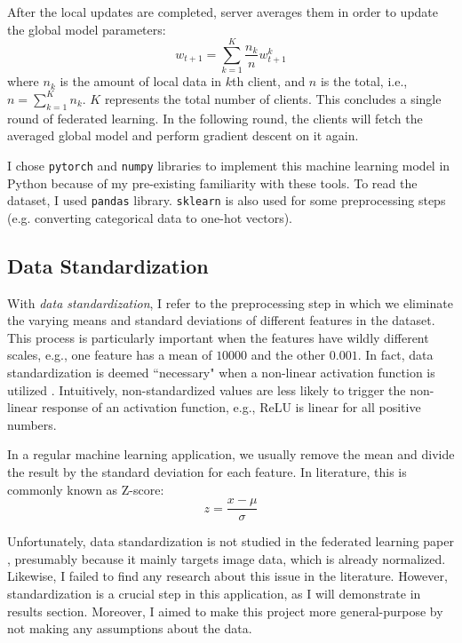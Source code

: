 After the local updates are completed, server averages them in order to update the global model parameters:
\begin{equation}
    w_{t+1} = \sum_{k=1}^K \frac{n_k}{n} w^k_{t+1}
\end{equation}
where $n_k$ is the amount of local data in $k$th client, and $n$ is the total, i.e., $n = \sum_{k=1}^K n_k$.
$K$ represents the total number of clients.
This concludes a single round of federated learning.
In the following round, the clients will fetch the averaged global model and perform gradient descent on it again.

I chose \verb|pytorch| and \verb|numpy| libraries to implement this machine learning model in Python because of my pre-existing familiarity with these tools.
To read the dataset, I used \verb|pandas| library.
\verb|sklearn| is also used for some preprocessing steps (e.g. converting categorical data to one-hot vectors).



\subsection{Data Standardization}

With \textit{data standardization}, I refer to the preprocessing step in which we eliminate the varying means and standard deviations of different features in the dataset.
This process is particularly important when the features have wildly different scales, e.g., one feature has a mean of $10000$ and the other $0.001$.
In fact, data standardization is deemed ``necessary" when a non-linear activation function is utilized \citep{standardizationANN}.
Intuitively, non-standardized values are less likely to trigger the non-linear response of an activation function, e.g., ReLU is linear for all positive numbers.

In a regular machine learning application, we usually remove the mean and divide the result by the standard deviation for each feature.
In literature, this is commonly known as Z-score:
\begin{equation}
    z = \frac{x - \mu}{\sigma}
\end{equation}

Unfortunately, data standardization is not studied in the federated learning paper \cite{comef-FL}, presumably because it mainly targets image data, which is already normalized.
Likewise, I failed to find any research about this issue in the literature.
However, standardization is a crucial step in this application, as I will demonstrate in results section.
Moreover, I aimed to make this project more general-purpose by not making any assumptions about the data.

